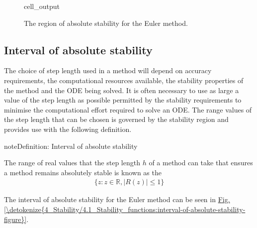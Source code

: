 \documentclass[letterpaper,10pt,english]{jupyterBook}
\begin{document}
\begin{figure}[htbp]
\centering
\capstart
\begin{sphinxVerbatimOutput}

\begin{sphinxuseclass}{cell_output}
\noindent{}

\end{sphinxuseclass}\end{sphinxVerbatimOutput}
\caption{The region of absolute stability for the Euler method.}\label{\detokenize{4_Stability/4.1_Stability_functions:euler-stability-region-figure}}\end{figure}


\subsection{Interval of absolute stability}
\label{\detokenize{4_Stability/4.1_Stability_functions:interval-of-absolute-stability}}\label{\detokenize{4_Stability/4.1_Stability_functions:interval-of-absolute-stability-section}}
\sphinxAtStartPar
The choice of step length used in a method will depend on accuracy requirements, the computational resources available, the stability properties of the method and the ODE being solved. It is often necessary to use as large a value of the step length as possible permitted by the stability requirements to minimise the computational effort required to solve an ODE. The range values of the step length that can be chosen is governed by the stability region and provides use with the following definition.

\begin{sphinxadmonition}{note}{Definition: Interval of absolute stability}

\sphinxAtStartPar
The range of real values that the step length \(h\) of a method can take that ensures a method remains absolutely stable is known as the 
\begin{align*}
    \{ z : z \in \mathbb{R}, |R(z)| \leq 1 \}
\end{align*}\end{sphinxadmonition}

\sphinxAtStartPar
The interval of absolute stability for the Euler method can be seen in \hyperref[\detokenize{4_Stability/4.1_Stability_functions:interval-of-absolute-stability-figure}]{Fig.\@ \ref{\detokenize{4_Stability/4.1_Stability_functions:interval-of-absolute-stability-figure}}}.
\end{document}

